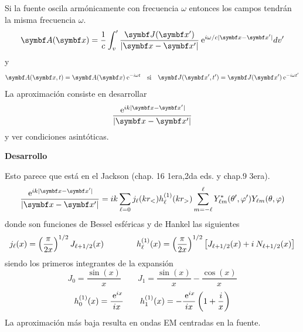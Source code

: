 \documentclass[10pt,oneside]{CBFT_book}
\begin{document}
Si la fuente oscila armónicamente con frecuencia $\omega$ entonces los campos tendrán la misma frecuencia 
$\omega$.
\[
	\vb{A}(\vb{x}) = \frac{1}{c} \int_v' \frac{\vb{J}(\vb{x}')}{|\vb{x}-\vb{x}'|}
		\euler^{i \omega/c |\vb{x}-\vb{x}'| } dv'
\]
y 
\[
	\vb{A}(\vb{x},t) = \vb{A}(\vb{x}) \euler^{-i \omega t} \quad \text{si} \quad
		\vb{J}(\vb{x}',t') = \vb{J}(\vb{x}') \euler^{-i \omega t'}
\]
La aproximación consiste en desarrollar 
\[
	\frac{\euler^{i k |\vb{x}-\vb{x}'| }}{|\vb{x}-\vb{x}'|}
\]
y ver condiciones asintóticas. 

\begin{ejemplo}{\bf Desarrollo}

Esto parece que está en el Jackson (chap. 16 1era,2da eds. y chap.9 3era).
\[
	\frac{\euler^{i k |\vb{x}-\vb{x}'| }}{|\vb{x}-\vb{x}'|} =
	i k \sum_{\ell=0} j_\ell(kr_<) h^{(1)}_\ell(kr_>) 
	\sum_{m=-\ell}^{\ell} Y_{\ell m}^*(\theta',\vp') Y_{\ell m}(\theta,\vp)
\]
donde son funciones de Bessel esféricas y de Hankel las siguientes
\[
	j_\ell(x) =  \left( \frac{ \pi }{ 2x } \right)^{1/2} J_{\ell +1/2}(x) \qquad \qquad 
	h^{(1)}_\ell(x) =  \left( \frac{ \pi }{ 2x } \right)^{1/2} \left[ J_{\ell +1/2}(x) + i \: N_{\ell +1/2}(x) \right]
\]
siendo los primeros integrantes de la expansión
\[
	J_0 = \frac{ \sin(x) }{ x }  \qquad 
	J_1 = \frac{\sin(x)}{x} - \frac{\cos(x)}{x}
\]
\[
	h^{(1)}_0(x) = \frac{ \:\mathrm{e}^{ix} }{ ix }  \qquad 
	h^{(1)}_1(x) = -\frac{ \:\mathrm{e}^{ix} }{ ix } \left( 1 + \frac{i}{x} \right)
\]
La aproximación más baja resulta en ondas EM centradas en la fuente.


\end{ejemplo}
\end{document}
